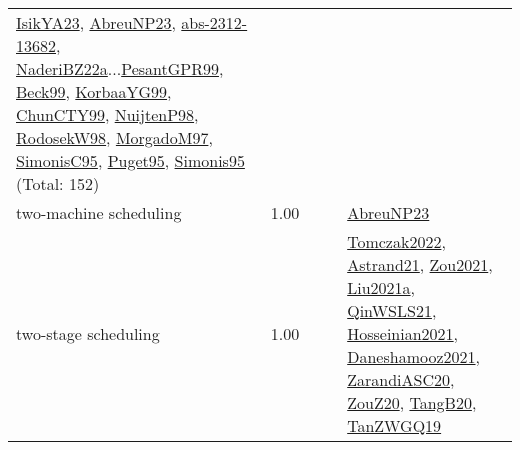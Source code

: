 {\begin{longtable}{p{3cm}r>{\raggedright\arraybackslash}p{6cm}>{\raggedright\arraybackslash}p{6cm}>{\raggedright\arraybackslash}p{8cm}}
\hyperref[detail:IsikYA23]{IsikYA23}, \hyperref[detail:AbreuNP23]{AbreuNP23}, \hyperref[detail:abs-2312-13682]{abs-2312-13682}, \hyperref[detail:NaderiBZ22a]{NaderiBZ22a}...\hyperref[detail:PesantGPR99]{PesantGPR99}, \hyperref[detail:Beck99]{Beck99}, \hyperref[detail:KorbaaYG99]{KorbaaYG99}, \hyperref[detail:ChunCTY99]{ChunCTY99}, \hyperref[detail:NuijtenP98]{NuijtenP98}, \hyperref[detail:RodosekW98]{RodosekW98}, \hyperref[detail:MorgadoM97]{MorgadoM97}, \hyperref[detail:SimonisC95]{SimonisC95}, \hyperref[detail:Puget95]{Puget95}, \hyperref[detail:Simonis95]{Simonis95} (Total: 152)\\
\index{two-machine scheduling}\index{Concepts!two-machine scheduling}two-machine scheduling &  1.00 &  &  & \hyperref[detail:AbreuNP23]{AbreuNP23}\\
\index{two-stage scheduling}\index{Concepts!two-stage scheduling}two-stage scheduling &  1.00 &  &  & \hyperref[detail:Tomczak2022]{Tomczak2022}, \hyperref[detail:Astrand21]{Astrand21}, \hyperref[detail:Zou2021]{Zou2021}, \hyperref[detail:Liu2021a]{Liu2021a}, \hyperref[detail:QinWSLS21]{QinWSLS21}, \hyperref[detail:Hosseinian2021]{Hosseinian2021}, \hyperref[detail:Daneshamooz2021]{Daneshamooz2021}, \hyperref[detail:ZarandiASC20]{ZarandiASC20}, \hyperref[detail:ZouZ20]{ZouZ20}, \hyperref[detail:TangB20]{TangB20}, \hyperref[detail:TanZWGQ19]{TanZWGQ19}\\

\end{longtable}}
